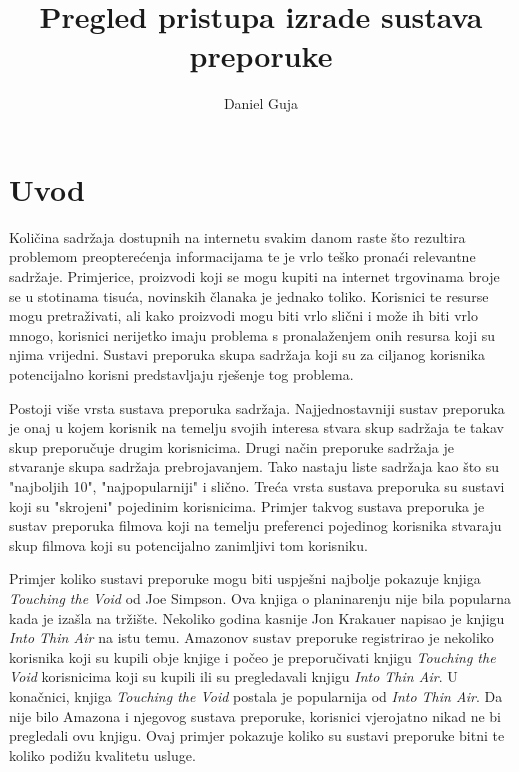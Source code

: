 \documentclass[times, utf8, seminar]{fer}
\begin{document}
\title{Pregled pristupa izrade sustava preporuke}
\author{Daniel Guja}

\maketitle

\tableofcontents

\chapter{Uvod}

Količina sadržaja dostupnih na internetu svakim danom raste što rezultira problemom preopterećenja informacijama te je vrlo teško pronaći relevantne sadržaje. Primjerice, proizvodi koji se mogu kupiti na internet trgovinama broje se u stotinama tisuća, novinskih članaka je jednako toliko. Korisnici te resurse mogu pretraživati, ali kako proizvodi mogu biti vrlo slični i može ih biti vrlo mnogo, korisnici nerijetko imaju problema s pronalaženjem onih resursa koji su njima vrijedni. Sustavi preporuka skupa sadržaja koji su za ciljanog korisnika potencijalno korisni predstavljaju rješenje tog problema.

Postoji više vrsta sustava preporuka sadržaja. Najjednostavniji sustav preporuka je onaj u kojem korisnik na temelju svojih interesa stvara skup sadržaja te takav skup preporučuje drugim korisnicima. Drugi način preporuke sadržaja je stvaranje skupa sadržaja prebrojavanjem. Tako nastaju liste sadržaja kao što su "najboljih 10", "najpopularniji" i slično. Treća vrsta sustava preporuka su sustavi koji su "skrojeni" pojedinim korisnicima. Primjer takvog sustava preporuka je sustav preporuka filmova koji na temelju preferenci pojedinog korisnika stvaraju skup filmova koji su potencijalno zanimljivi tom korisniku.

Primjer koliko sustavi preporuke mogu biti uspješni najbolje pokazuje knjiga \textit{Touching the Void} od Joe Simpson. Ova knjiga o planinarenju nije bila popularna kada je izašla na tržište. Nekoliko godina kasnije Jon Krakauer napisao je knjigu \textit{Into Thin Air} na istu temu. Amazonov sustav preporuke registrirao je nekoliko korisnika koji su kupili obje knjige i počeo je preporučivati knjigu \textit{Touching the Void} korisnicima koji su kupili ili su pregledavali knjigu \textit{Into Thin Air}. U konačnici, knjiga \textit{Touching the Void} postala je popularnija od \textit{Into Thin Air}. Da nije bilo Amazona i njegovog sustava preporuke, korisnici vjerojatno nikad ne bi pregledali ovu knjigu. Ovaj primjer pokazuje koliko su sustavi preporuke bitni te koliko podižu kvalitetu usluge.
\end{document}
